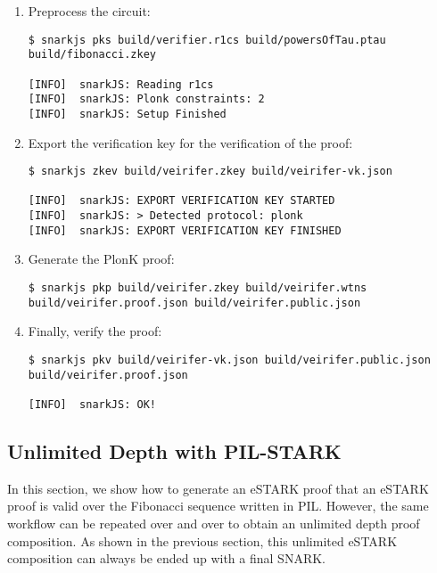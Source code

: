 \begin{enumerate}
\item Preprocess the circuit:
\begin{lstlisting}[style=termt]
$ snarkjs pks build/verifier.r1cs build/powersOfTau.ptau build/fibonacci.zkey

[INFO]  snarkJS: Reading r1cs
[INFO]  snarkJS: Plonk constraints: 2
[INFO]  snarkJS: Setup Finished
\end{lstlisting}

\item Export the verification key for the verification of the proof:
\begin{lstlisting}[style=termt]
$ snarkjs zkev build/veirifer.zkey build/veirifer-vk.json

[INFO]  snarkJS: EXPORT VERIFICATION KEY STARTED
[INFO]  snarkJS: > Detected protocol: plonk
[INFO]  snarkJS: EXPORT VERIFICATION KEY FINISHED
\end{lstlisting}

\item Generate the PlonK proof:
\begin{lstlisting}[style=termt]
$ snarkjs pkp build/veirifer.zkey build/veirifer.wtns build/veirifer.proof.json build/veirifer.public.json
\end{lstlisting}

\item Finally, verify the proof:
\begin{lstlisting}[style=termt]
$ snarkjs pkv build/veirifer-vk.json build/veirifer.public.json build/veirifer.proof.json

[INFO]  snarkJS: OK!
\end{lstlisting}
\end{enumerate}



\subsection{Unlimited Depth with PIL-STARK}

In this section, we show how to generate an eSTARK proof that an eSTARK proof is valid over the Fibonacci sequence written in PIL. However, the same workflow can be repeated over and over to obtain an unlimited depth proof composition. As shown in the previous section, this unlimited eSTARK composition can always be ended up with a final SNARK. 


